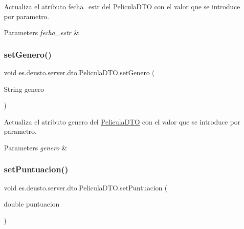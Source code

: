 Actualiza el atributo fecha\+\_\+estr del \mbox{\hyperlink{classes_1_1deusto_1_1server_1_1dto_1_1_pelicula_d_t_o}{Pelicula\+D\+TO}} con el valor que se introduce por parametro. 
\begin{DoxyParams}{Parameters}
{\em fecha\+\_\+estr} & \\
\hline
\end{DoxyParams}
\mbox{\label{classes_1_1deusto_1_1server_1_1dto_1_1_pelicula_d_t_o_a9e8ed8ffc80f591e333c9a8b1f14cc07}} 
\subsubsection{\texorpdfstring{setGenero()}{setGenero()}}
{\footnotesize\ttfamily void es.\+deusto.\+server.\+dto.\+Pelicula\+D\+T\+O.\+set\+Genero (\begin{DoxyParamCaption}\item[{String}]{genero }\end{DoxyParamCaption})}

Actualiza el atributo genero del \mbox{\hyperlink{classes_1_1deusto_1_1server_1_1dto_1_1_pelicula_d_t_o}{Pelicula\+D\+TO}} con el valor que se introduce por parametro. 
\begin{DoxyParams}{Parameters}
{\em genero} & \\
\hline
\end{DoxyParams}
\mbox{\label{classes_1_1deusto_1_1server_1_1dto_1_1_pelicula_d_t_o_a47f7353eee852105075ca6fb74d9482b}} 
\subsubsection{\texorpdfstring{setPuntuacion()}{setPuntuacion()}}
{\footnotesize\ttfamily void es.\+deusto.\+server.\+dto.\+Pelicula\+D\+T\+O.\+set\+Puntuacion (\begin{DoxyParamCaption}\item[{double}]{puntuacion }\end{DoxyParamCaption})}

